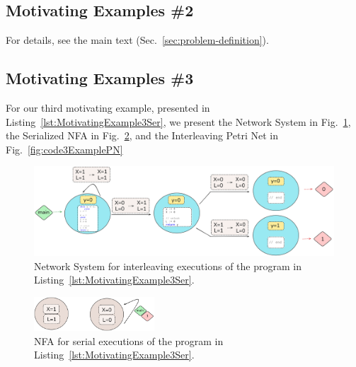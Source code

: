 %

\subsection{Motivating Examples \#2}
\label{appendix:subsec::Ex1B:NS}

For details, see the main text (Sec.~\ref{sec:problem-definition}).


\subsection{Motivating Examples \#3}
\label{appendix:subsec:Ex1C:NS}


For our third motivating example, presented in Listing~\ref{lst:MotivatingExample3Ser}, we present the Network System in Fig.~\ref{fig:code3ExampleNS}, the Serialized NFA in Fig.~\ref{fig:code3ExampleNFA}, and the Interleaving Petri Net in Fig.~\ref{fig:code3ExamplePN}

%		
%		
%

\begin{figure}[!htbp]
	\centering
	\includegraphics[width=1.1\textwidth]{plots/code_3_NS.png}
	\caption{Network System for interleaving executions of the program in Listing~\ref{lst:MotivatingExample3Ser}.}
	\label{fig:code3ExampleNS}
\end{figure}


\begin{figure}[!htbp]
	\centering
	\includegraphics[width=0.4\textwidth]{plots/code_3_NFA.png}
	\caption{NFA for serial executions of the program in Listing~\ref{lst:MotivatingExample3Ser}.}
	\label{fig:code3ExampleNFA}
\end{figure}



